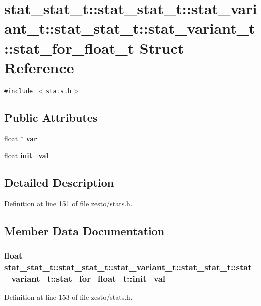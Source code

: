 \section{stat\_\-stat\_\-t::stat\_\-stat\_\-t::stat\_\-variant\_\-t::stat\_\-stat\_\-t::stat\_\-variant\_\-t::stat\_\-for\_\-float\_\-t Struct Reference}
\label{structstat__stat__t_1_1stat__variant__t_1_1stat__for__float__t}
{\tt \#include $<$stats.h$>$}

\subsection*{Public Attributes}
\begin{CompactItemize}
\item 
float $\ast$ {\bf var}
\item 
float {\bf init\_\-val}
\end{CompactItemize}


\subsection{Detailed Description}


Definition at line 151 of file zesto/stats.h.

\subsection{Member Data Documentation}
\subsubsection[{init\_\-val}]{\setlength{\rightskip}{0pt plus 5cm}float stat\_\-stat\_\-t::stat\_\-stat\_\-t::stat\_\-variant\_\-t::stat\_\-stat\_\-t::stat\_\-variant\_\-t::stat\_\-for\_\-float\_\-t::init\_\-val}\label{structstat__stat__t_1_1stat__variant__t_1_1stat__for__float__t_4fb90733fffd75a512bc1b5e73ba2d7a}




Definition at line 153 of file zesto/stats.h.
